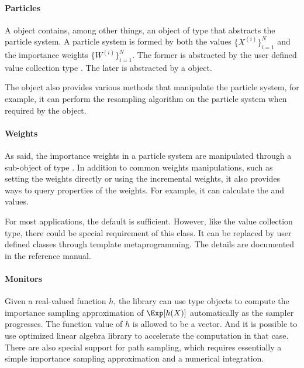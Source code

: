 \paragraph{Particles}

A  object contains, among other things, an object of type  that abstracts the particle system. A particle system is formed by both the values $\{X^{(i)}\}_{i=1}^N$ and the importance weights $\{W^{(i)}\}_{i=1}^N$. The former is abstracted by the user defined value collection type . The later is abstracted by a  object.

The  object also provides various methods that manipulate the particle system, for example, it can perform the resampling algorithm on the particle system when required by the  object.

\paragraph{Weights}

As said, the importance weights in a particle system are manipulated through a sub-object of type . In addition to common weights manipulations, such as setting the weights directly or using the incremental weights, it also provides ways to query properties of the weights. For example, it can calculate the \ess and \cess values.

For most applications, the default  is sufficient. However, like the value collection type, there could be special requirement of this class. It can be replaced by user defined classes through \cpp template metaprogramming. The details are documented in the reference manual.

\paragraph{Monitors}

Given a real-valued function $h$, the library can use  type objects to compute the importance sampling approximation of $\Exp[h(X)]$ automatically as the sampler progresses. The function value of $h$ is allowed to be a vector. And it is possible to use optimized linear algebra library to accelerate the computation in that case. There are also special support for path sampling, which requires essentially a simple importance sampling approximation and a numerical integration.

